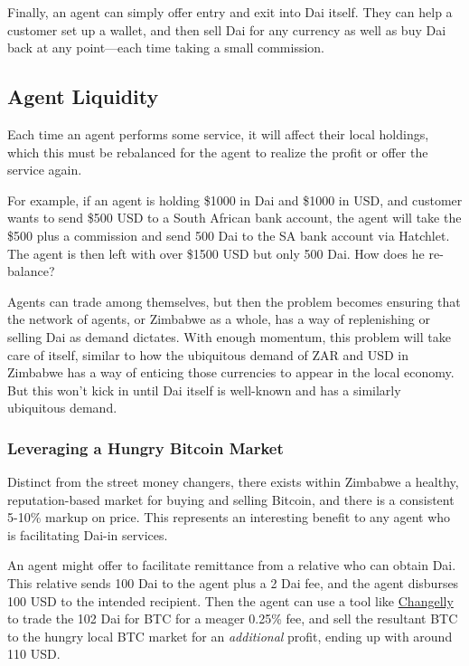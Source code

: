 \documentclass{article}
\begin{document}
Finally, an agent can simply offer entry and exit into Dai itself. They can help a customer set up a wallet, and then sell Dai for any currency as well as buy Dai back at any point---each time taking a small commission.

\subsection{Agent Liquidity} \label{liquidity}

Each time an agent performs some service, it will affect their local holdings, which this must be rebalanced for the agent to realize the profit or offer the service again.

For example, if an agent is holding \$1000 in Dai and \$1000 in USD, and customer wants to send \$500 USD to a South African bank account, the agent will take the \$500 plus a commission and send 500 Dai to the SA bank account via Hatchlet. The agent is then left with over \$1500 USD but only 500 Dai. How does he re-balance?

Agents can trade among themselves, but then the problem becomes ensuring that the network of agents, or Zimbabwe as a whole, has a way of replenishing or selling Dai as demand dictates. With enough momentum, this problem will take care of itself, similar to how the ubiquitous demand of ZAR and USD in Zimbabwe has a way of enticing those currencies to appear in the local economy. But this won't kick in until Dai itself is well-known and has a similarly ubiquitous demand.

\subsubsection{Leveraging a Hungry Bitcoin Market} \label{bitcoin liquidity}

Distinct from the street money changers, there exists within Zimbabwe a healthy, reputation-based market for buying and selling Bitcoin, and there is a consistent 5-10\% markup on price. This represents an interesting benefit to any agent who is facilitating Dai-in services.

An agent might offer to facilitate remittance from a relative who can obtain Dai. This relative sends 100 Dai to the agent plus a 2 Dai fee, and the agent disburses 100 USD to the intended recipient. Then the agent can use a tool like \href{https://changelly.com/}{Changelly} to trade the 102 Dai for BTC for a meager 0.25\% fee, and sell the resultant BTC to the hungry local BTC market for an \textit{additional} profit, ending up with around 110 USD.
\end{document}
